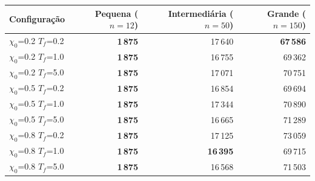 \begin{tabular}{lrrr}
\toprule
Configuração & Pequena ($n=12$) & Intermediária ($n=50$) & Grande ($n=150$) \\
\midrule
$\chi_0$=0.2 $T_f$=0.2 & \textbf{1\,875} & 17\,640 & \textbf{67\,586} \\
$\chi_0$=0.2 $T_f$=1.0 & \textbf{1\,875} & 16\,755 & 69\,362 \\
$\chi_0$=0.2 $T_f$=5.0 & \textbf{1\,875} & 17\,071 & 70\,751 \\
$\chi_0$=0.5 $T_f$=0.2 & \textbf{1\,875} & 16\,854 & 69\,694 \\
$\chi_0$=0.5 $T_f$=1.0 & \textbf{1\,875} & 17\,344 & 70\,890 \\
$\chi_0$=0.5 $T_f$=5.0 & \textbf{1\,875} & 16\,665 & 71\,289 \\
$\chi_0$=0.8 $T_f$=0.2 & \textbf{1\,875} & 17\,125 & 73\,059 \\
$\chi_0$=0.8 $T_f$=1.0 & \textbf{1\,875} & \textbf{16\,395} & 69\,715 \\
$\chi_0$=0.8 $T_f$=5.0 & \textbf{1\,875} & 16\,568 & 71\,503 \\
\bottomrule
\end{tabular}
